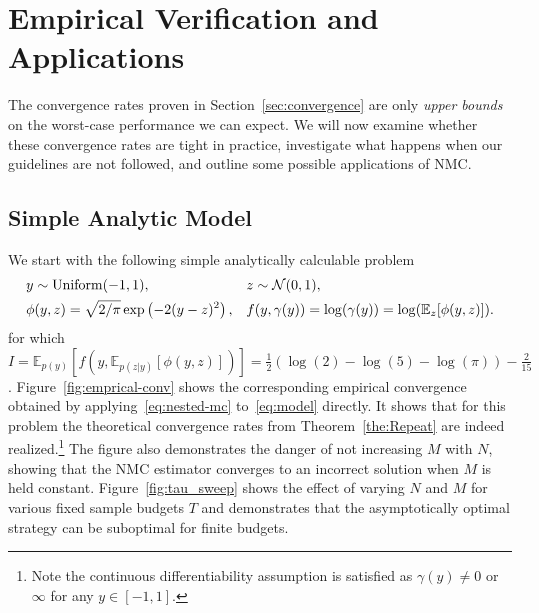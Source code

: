 
\section{Empirical Verification and Applications}
\label{sec:empirical}

The convergence rates proven in Section~\ref{sec:convergence} are only
\emph{upper bounds} on the worst-case performance we can expect. We will now
examine whether these convergence rates are tight in practice, investigate what happens
when our guidelines are not followed, and outline some possible applications of NMC. 

\subsection{Simple Analytic Model}
\label{sec:simple}

We start with the following simple analytically calculable problem
\begin{equation}
\begin{aligned}
\label{eq:model}
& y \sim \mathrm{Uniform}(-1,1), &&
z \sim \mathcal{N}(0,1), \\
& \phi(y,z) = \sqrt{2/\pi}\exp\left(-2(y-z)^2\right), &&
f(y,\gamma(y)) = \log (\gamma (y)) = \log(\mathbb{E}_z[\phi(y,z)]).
\end{aligned}
\end{equation}
for which $I = \mathbb{E}_{p(y)}\left[f\left(y,\mathbb{E}_{p(z|y)}
\left[\phi(y,z)\right]\right)\right]=\frac{1}{2}\left(\log(2)-\log(5)-\log(\pi)\right)-\frac{2}{15}$.
Figure~\ref{fig:emprical-conv} shows the corresponding empirical convergence obtained by
applying~\eqref{eq:nested-mc} to~\eqref{eq:model} directly. It shows that for this
problem the theoretical convergence rates from Theorem~\ref{the:Repeat} are indeed
realized.\footnote{Note the continuous differentiability assumption is satisfied as $\gamma(y)\neq0$
or $\infty$ for any $y\in[-1,1]$.}
The figure also demonstrates the danger of not increasing
$M$ with $N$, showing that the NMC estimator converges to an incorrect solution when $M$
is held constant.  Figure~\ref{fig:tau_sweep} shows the effect of varying $N$ and $M$ for various
fixed sample budgets $T$ and demonstrates that the asymptotically optimal strategy can be suboptimal
for finite budgets.

